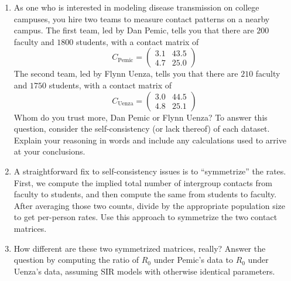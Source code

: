 \documentclass[11pt]{article}
\begin{document}
\begin{enumerate}
\begin{enumerate}[label=\alph*.]
	\item As one who is interested in modeling disease transmission on college campuses, you hire two teams to measure contact patterns on a nearby campus. The first team, led by Dan Pemic, tells you that there are $200$ faculty and $1800$ students, with a contact matrix of 
	$$C_\text{Pemic} = \begin{pmatrix}
		3.1 & 43.5 \\
		4.7 & 25.0
	\end{pmatrix}$$
The second team, led by Flynn Uenza, tells you that there are $210$ faculty and $1750$ students, with a contact matrix of
	$$C_\text{Uenza} = \begin{pmatrix}
		3.0 & 44.5 \\
		4.8 & 25.1
		\end{pmatrix}
	$$
Whom do you trust more, Dan Pemic or Flynn Uenza? To answer this question, consider the self-consistency (or lack thereof) of each dataset. Explain your reasoning in words and include any calculations used to arrive at your conclusions. 

\item A straightforward fix to self-consistency issues is to ``symmetrize'' the rates. First, we compute the implied total number of intergroup contacts from faculty to students, and then compute the same from students to faculty. After averaging those two counts, divide by the appropriate population size to get per-person rates. Use this approach to symmetrize the two contact matrices. 

\item How different are these two symmetrized matrices, really? Answer the question by computing the ratio of $R_0$ under Pemic's data to $R_0$ under Uenza's data, assuming SIR models with otherwise identical parameters.

\end{enumerate}


\end{enumerate}
\end{document}
